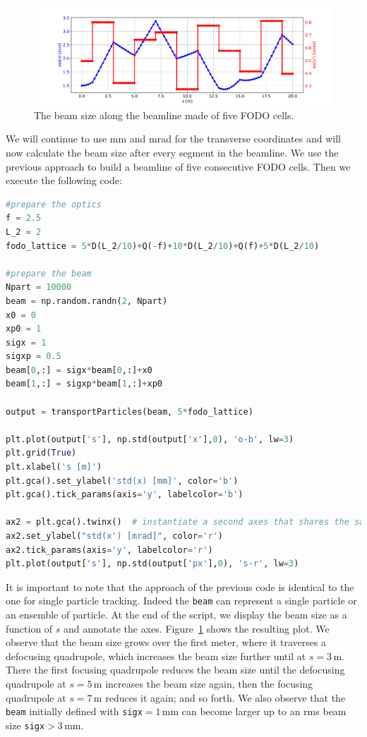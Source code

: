 \documentclass{article}
\begin{document}
\par
\begin{figure}[tb]
\begin{center}
\includegraphics[width=\textwidth]{_img_primer/exercise14.pdf}
\end{center}
\caption{\label{fig:sigvzs}The beam size along the beamline made of five FODO cells.}
\end{figure}
We will continue to use mm and mrad for the transverse coordinates and will now 
calculate the beam size after every segment in the beamline. We use the previous approach 
to build a beamline of five consecutive FODO cells. Then we execute the following code:
\begin{lstlisting}[language=Python]
#prepare the optics
f = 2.5
L_2 = 2
fodo_lattice = 5*D(L_2/10)+Q(-f)+10*D(L_2/10)+Q(f)+5*D(L_2/10)

#prepare the beam
Npart = 10000
beam = np.random.randn(2, Npart)
x0 = 0
xp0 = 1
sigx = 1
sigxp = 0.5
beam[0,:] = sigx*beam[0,:]+x0
beam[1,:] = sigxp*beam[1,:]+xp0

output = transportParticles(beam, 5*fodo_lattice)

plt.plot(output['s'], np.std(output['x'],0), 'o-b', lw=3)
plt.grid(True)
plt.xlabel('s [m]')
plt.gca().set_ylabel('std(x) [mm]', color='b')
plt.gca().tick_params(axis='y', labelcolor='b')

ax2 = plt.gca().twinx()  # instantiate a second axes that shares the same x-axis
ax2.set_ylabel("std(x') [mrad]", color='r')
ax2.tick_params(axis='y', labelcolor='r')
plt.plot(output['s'], np.std(output['px'],0), 's-r', lw=3)
\end{lstlisting}
It is important to note that the approach of the previous code is identical to the one for single particle tracking. Indeed the {\tt beam} can represent a single particle or an ensemble of particle.
At the end of the script, we 
display the beam size as a function of $s$ and annotate the axes. Figure~\ref{fig:sigvzs}
shows the resulting plot. We observe that the beam size grows over the first meter, where
it traverses a defocusing quadrupole, which increases the beam size further until at 
$s=3\,$m. There the first focusing quadrupole reduces the beam size until the defocusing quadrupole 
at $s=5\,$m increases the beam size again, then the focusing quadrupole at $s=7\,$m 
reduces it again; and so forth. We also observe that the {\tt beam} initially defined with {\tt sigx}$=1\,$mm can become larger up to an rms beam size {\tt sigx}$>3\,$mm.
\end{document}
